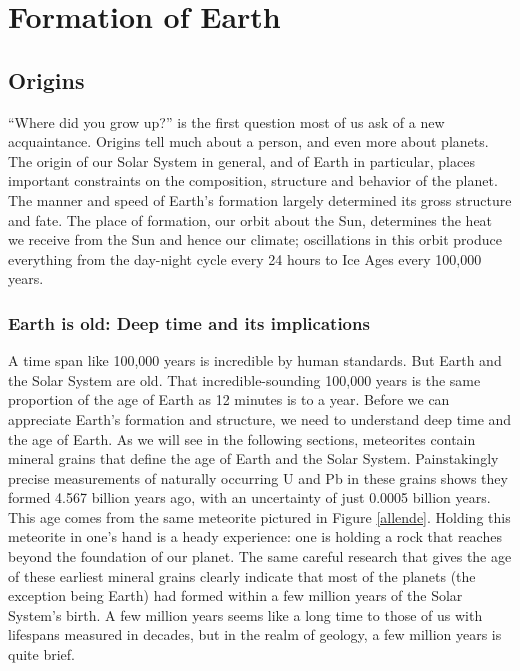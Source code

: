 \documentclass[amstex,12pt]{book}
\begin{document}
\section{Formation of Earth}
\subsection{Origins}
``Where did you grow up?'' is the first question most of us ask of a new acquaintance. Origins tell much about a person, and even more about planets. The origin of our Solar System in general, and of Earth in particular, places important constraints on the composition, structure and behavior of the planet. The manner and speed of Earth's formation largely determined its gross structure and fate. The place of formation, our orbit about the Sun, determines the heat we receive from the Sun and hence our climate; oscillations in this orbit produce everything from the day-night cycle every 24 hours to Ice Ages every 100,000 years. 

\subsubsection{Earth is old: Deep time and its implications}
A time span like 100,000 years is incredible by human standards. But Earth and the Solar System are old. That incredible-sounding 100,000 years is the same proportion of the age of Earth as 12 minutes is to a year. Before we can appreciate Earth's formation and structure, we need to understand deep time and the age of Earth. As we will see in the following sections, meteorites contain mineral grains that define the age of Earth and the Solar System. Painstakingly precise measurements of naturally occurring U and Pb in these grains shows they formed 4.567 billion years ago, with an uncertainty of just 0.0005 billion years. This age comes from the same meteorite pictured in Figure \ref{allende}. Holding this meteorite in one's hand is a heady experience: one is holding a rock that reaches beyond the foundation of our planet. The same careful research that gives the age of these earliest mineral grains clearly indicate that most of the planets (the exception being Earth) had formed within a few million years of the Solar System's birth. A few million years seems like a long time to those of us with lifespans measured in decades, but in the realm of geology, a few million years is quite brief.\\
\end{document}
